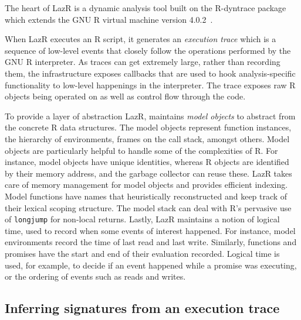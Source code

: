 \documentclass[review,nonacm,screen,acmsmall,anonymous=true]{acmart}
\newcommand{\rdyn}{{\sf R-dyntrace}\xspace}
\renewcommand{\c}[1]{\lstinline |#1|\xspace}
\newcommand{\lazr}{{\sf LazR}\xspace}
\begin{document}
The heart of \lazr is a dynamic analysis tool built on the \rdyn package which
extends the GNU R virtual machine version 4.0.2~\cite{oopsla19b}.

When \lazr executes an R script, it generates an \emph{execution trace} which is
a sequence of low-level events that closely follow the operations performed by
the GNU R interpreter. As traces can get extremely large, rather than recording
them, the infrastructure exposes callbacks that are used to hook
analysis-specific functionality to low-level happenings in the interpreter. The
trace exposes raw R objects being operated on as
well as control flow through the code.

To provide a layer of abstraction \lazr, maintains \emph{model objects} to
abstract from the concrete R data structures. The model objects represent
function instances, the hierarchy of environments, frames on the call stack,
amongst others. Model objects are particularly helpful to handle some of the
complexities of R. For instance, model objects have unique identities, whereas R
objects are identified by their memory address, and the garbage collector can
reuse these. \lazr takes care of memory management for model objects and
provides efficient indexing. Model functions have names that heuristically
reconstructed and keep track of their lexical scoping structure. The model stack
can deal with R's pervasive use of \c{longjump} for non-local returns. Lastly,
\lazr maintains a notion of logical time, used to record when some
events of interest happened. For instance, model environments record the time of
last read and last write. Similarly, functions and promises have the start and
end of their evaluation recorded. Logical time is used, for example, to decide
if an event happened while a promise was executing, or the ordering of events
such as reads and writes.

\subsection{Inferring signatures from an execution trace}
\end{document}
